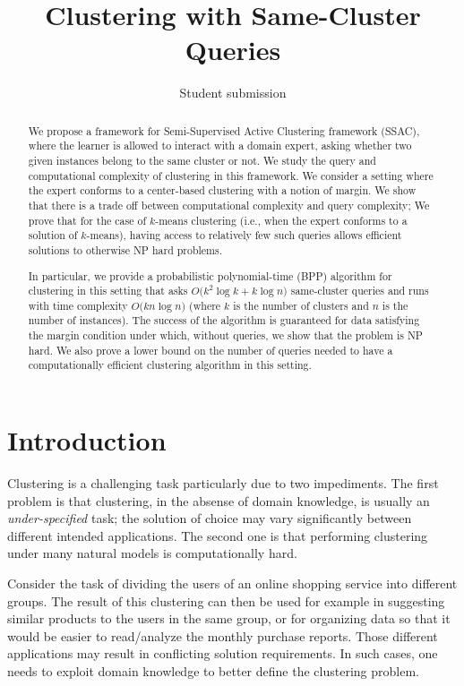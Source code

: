 \documentclass{article}
\title{Clustering with Same-Cluster Queries}
\author{Student submission}
\begin{document}
\maketitle

\begin{abstract}
We propose a framework for Semi-Supervised Active Clustering framework (SSAC), where the learner is allowed to interact with a domain expert, asking whether two given instances belong to the same cluster or not. We study the query and computational complexity of clustering in this framework. We consider a setting where the expert conforms to a center-based clustering with a notion of margin.  We show that there is a trade off between computational complexity and query complexity; We prove that for the case of $k$-means clustering (i.e., when the expert conforms to a solution of $k$-means), having access to relatively few such queries allows efficient solutions to otherwise NP hard problems.

In particular, we provide a probabilistic polynomial-time (BPP) algorithm  for clustering in this setting that asks $O\big(k^2\log k + k\log n)$ same-cluster queries and runs with time complexity $O\big(kn\log n)$ (where $k$ is the number of clusters and $n$ is the number of instances). The success of the algorithm is guaranteed for data satisfying the margin condition under which, without queries, we show that the problem is NP hard. We also prove a lower bound on the number of queries needed to have a computationally efficient clustering algorithm in this setting.
\end{abstract}

\section{Introduction}

Clustering is a challenging task particularly due to two impediments. The first problem is that clustering, in the absense of domain knowledge, is usually an \emph{under-specified} task; the solution of choice may vary significantly between different intended applications. The second one is that performing clustering under many natural models is computationally hard.

Consider the task of dividing the users of an online shopping service into different groups. The result of this clustering can then be used for example in suggesting similar products to the users in the same group, or for organizing data so that it would be easier to read/analyze the monthly purchase reports. Those different applications may result in conflicting solution requirements. In such cases, one needs to exploit domain knowledge to better define the clustering problem.
\end{document}
